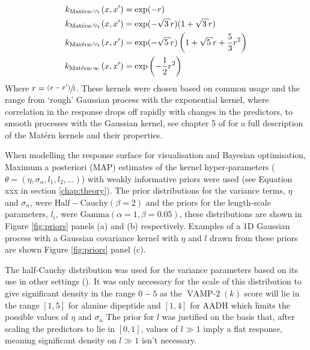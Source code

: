 \begin{align}
k_{\text{Mat\'{e}rn-\sfrac{1}{2}}}\left(x, x^{\prime}\right) &=\exp (-r) \label{eqn:kern_exp}\\
k_{\text{Mat\'{e}rn-\sfrac{3}{2}}}\left(x, x^{\prime}\right) &= \exp (-\sqrt{3} r)(1+\sqrt{3} r) \label{eqn:kern_m32} \\
k_{\text{Mat\'{e}rn-\sfrac{5}{2}}}\left(x, x^{\prime}\right) &= \exp (-\sqrt{5} r)\left(1+\sqrt{5} r+\frac{5}{3} r^{2}\right) \label{eqn:kern_m52}\\
k_{\text{Mat\'{e}rn-}\infty}\left(x, x^{\prime}\right) &= \exp \left(-\frac{1}{2} r^{2}\right) \label{eqn:kern_gauss}
\end{align}
Where $r = \sfrac{(x-x^{\prime})}{l}$. These kernels were chosen based on common usage \cite{shahriariTakingHumanOut2016} and the range from `rough' Gaussian process with the exponential kernel, where correlation in the response drops off rapidly with changes in the predictors, to smooth processes with the Gaussian kernel, see chapter 5 of \cite{rasmussenGaussianProcessesMachine2006} for a full description of the Mat\'{e}rn kernels and their properties.  

When modelling the response surface for visualisation and Bayesian optimisation, Maximum a posteriori (MAP) estimates  of the kernel hyper-parameters ($\theta = (\eta, \sigma_{n}, l_{1}, l_{2}, ...)$) with weakly informative priors were used (see Equation xxx in section \ref{chap:theory}). The prior distributions for the variance terms, $\eta$ and $\sigma_{n}$, were $\mathrm{Half-Cauchy}(\beta=2)$ and the priors for the length-scale parameters, $l_{i}$, were $\mathrm{Gamma}(\alpha=1, \beta=0.05)$, these distributions are shown in Figure \ref{fig:priors} panels (a) and (b) respectively.  Examples of a 1D Gaussian process with a Gaussian covariance kernel with $\eta$ and $l$ drawn from these priors are shown Figure \ref{fig:priors} panel (c).  
 
The half-Cauchy distribution  was used for the variance parameters  based on its use in other settings (\cite{polsonHalfCauchyPriorGlobal2012}). It was  only necessary for the scale of this distribution to give significant density in the range $0-5$ as the $\operatorname{VAMP-2}(k)$ score will lie in the range $[1,5]$ for alanine dipeptide and $[1, 4]$ for AADH which limits the possible values of $\eta$ and $\sigma_{n}$ The prior for $l$ was justified on the basis that, after scaling the predictors to lie in $[0, 1]$, values of $l \gg 1$ imply a flat response, meaning significant density on $l \gg 1$ isn't necessary. 

